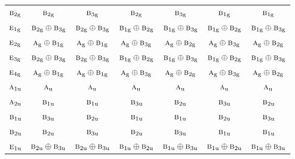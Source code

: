 \documentclass[10pt,a4paper]{article}
\numberwithin{equation}{section}
\newcommand{\irr}[1]{\text{\normalfont\scshape #1}}
\newcommand{\ptag}[1]{\mathrm{#1}}
\begin{document}
{\begin{longtable}{@{}lcccccc@{}}
$\irr{b}_{2\ptag{g}}$ & $\irr{b}_{2\ptag{g}}$ & $\irr{b}_{3\ptag{g}}$ & $\irr{b}_{2\ptag{g}}$ & $\irr{b}_{3\ptag{g}}$ & $\irr{b}_{1\ptag{g}}$ & $\irr{b}_{1\ptag{g}}$\\
$\irr{e}_{1\ptag{g}}$ & $\irr{b}_{2\ptag{g}}\oplus \irr{b}_{3\ptag{g}}$ & $\irr{b}_{2\ptag{g}}\oplus \irr{b}_{3\ptag{g}}$ & $\irr{b}_{1\ptag{g}}\oplus \irr{b}_{2\ptag{g}}$ & $\irr{b}_{1\ptag{g}}\oplus \irr{b}_{3\ptag{g}}$ & $\irr{b}_{1\ptag{g}}\oplus \irr{b}_{2\ptag{g}}$ & $\irr{b}_{1\ptag{g}}\oplus \irr{b}_{3\ptag{g}}$\\
$\irr{e}_{2\ptag{g}}$ & $\irr{a}_{\ptag{g}}\oplus \irr{b}_{1\ptag{g}}$ & $\irr{a}_{\ptag{g}}\oplus \irr{b}_{1\ptag{g}}$ & $\irr{a}_{\ptag{g}}\oplus \irr{b}_{3\ptag{g}}$ & $\irr{a}_{\ptag{g}}\oplus \irr{b}_{2\ptag{g}}$ & $\irr{a}_{\ptag{g}}\oplus \irr{b}_{3\ptag{g}}$ & $\irr{a}_{\ptag{g}}\oplus \irr{b}_{2\ptag{g}}$\\
$\irr{e}_{3\ptag{g}}$ & $\irr{b}_{2\ptag{g}}\oplus \irr{b}_{3\ptag{g}}$ & $\irr{b}_{2\ptag{g}}\oplus \irr{b}_{3\ptag{g}}$ & $\irr{b}_{1\ptag{g}}\oplus \irr{b}_{2\ptag{g}}$ & $\irr{b}_{1\ptag{g}}\oplus \irr{b}_{3\ptag{g}}$ & $\irr{b}_{1\ptag{g}}\oplus \irr{b}_{2\ptag{g}}$ & $\irr{b}_{1\ptag{g}}\oplus \irr{b}_{3\ptag{g}}$\\
$\irr{e}_{4\ptag{g}}$ & $\irr{a}_{\ptag{g}}\oplus \irr{b}_{1\ptag{g}}$ & $\irr{a}_{\ptag{g}}\oplus \irr{b}_{1\ptag{g}}$ & $\irr{a}_{\ptag{g}}\oplus \irr{b}_{3\ptag{g}}$ & $\irr{a}_{\ptag{g}}\oplus \irr{b}_{2\ptag{g}}$ & $\irr{a}_{\ptag{g}}\oplus \irr{b}_{3\ptag{g}}$ & $\irr{a}_{\ptag{g}}\oplus \irr{b}_{2\ptag{g}}$\\
$\irr{a}_{1\ptag{u}}$ & $\irr{a}_{\ptag{u}}$ & $\irr{a}_{\ptag{u}}$ & $\irr{a}_{\ptag{u}}$ & $\irr{a}_{\ptag{u}}$ & $\irr{a}_{\ptag{u}}$ & $\irr{a}_{\ptag{u}}$\\
$\irr{a}_{2\ptag{u}}$ & $\irr{b}_{1\ptag{u}}$ & $\irr{b}_{1\ptag{u}}$ & $\irr{b}_{3\ptag{u}}$ & $\irr{b}_{2\ptag{u}}$ & $\irr{b}_{3\ptag{u}}$ & $\irr{b}_{2\ptag{u}}$\\
$\irr{b}_{1\ptag{u}}$ & $\irr{b}_{3\ptag{u}}$ & $\irr{b}_{2\ptag{u}}$ & $\irr{b}_{1\ptag{u}}$ & $\irr{b}_{1\ptag{u}}$ & $\irr{b}_{2\ptag{u}}$ & $\irr{b}_{3\ptag{u}}$\\
$\irr{b}_{2\ptag{u}}$ & $\irr{b}_{2\ptag{u}}$ & $\irr{b}_{3\ptag{u}}$ & $\irr{b}_{2\ptag{u}}$ & $\irr{b}_{3\ptag{u}}$ & $\irr{b}_{1\ptag{u}}$ & $\irr{b}_{1\ptag{u}}$\\
$\irr{e}_{1\ptag{u}}$ & $\irr{b}_{2\ptag{u}}\oplus \irr{b}_{3\ptag{u}}$ & $\irr{b}_{2\ptag{u}}\oplus \irr{b}_{3\ptag{u}}$ & $\irr{b}_{1\ptag{u}}\oplus \irr{b}_{2\ptag{u}}$ & $\irr{b}_{1\ptag{u}}\oplus \irr{b}_{3\ptag{u}}$ & $\irr{b}_{1\ptag{u}}\oplus \irr{b}_{2\ptag{u}}$ & $\irr{b}_{1\ptag{u}}\oplus \irr{b}_{3\ptag{u}}$\\

\end{longtable}}
\end{document}
